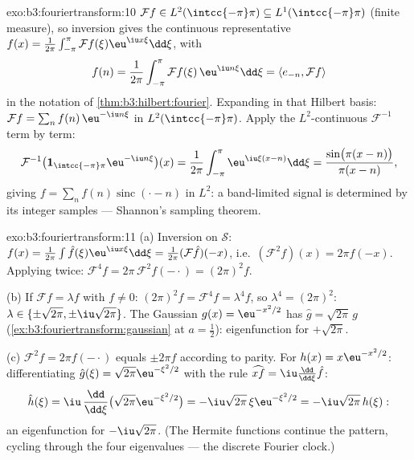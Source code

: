 \begin{solution}{exo:b3:fouriertransform:10}
$\mathcal Ff \in L^2(\intcc{-\pi}\pi) \subseteq
L^1(\intcc{-\pi}\pi)$ (finite measure), so inversion gives the
continuous representative $f(x) =
\frac1{2\pi}\int_{-\pi}^\pi\mathcal Ff(\xi)\eu^{\iu
x\xi}\dd\xi$, with
\[
f(n) = \frac1{2\pi}\int_{-\pi}^{\pi}\mathcal
Ff(\xi)\,\eu^{\iu n\xi}\dd\xi = \langle e_{-n}, \mathcal
Ff\rangle
\]
in the notation of \cref{thm:b3:hilbert:fourier}. Expanding in
that Hilbert basis: $\mathcal Ff = \sum_nf(n)\,\eu^{-\iu
n\xi}$ in $L^2(\intcc{-\pi}\pi)$. Apply the
$L^2$-continuous $\mathcal F^{-1}$ term by term:
\[
\mathcal F^{-1}\bigl(\mathbf
1_{\intcc{-\pi}\pi}\eu^{-\iu n\xi}\bigr)(x)
= \frac1{2\pi}\int_{-\pi}^{\pi}\eu^{\iu\xi(x - n)}\dd\xi
= \frac{\sin\bigl(\pi(x-n)\bigr)}{\pi(x - n)} ,
\]
giving $f = \sum_nf(n)\operatorname{sinc}(\cdot - n)$ in
$L^2$: a band-limited signal is determined by its integer
samples --- Shannon's sampling theorem.
\end{solution}

\begin{solution}{exo:b3:fouriertransform:11}
(a) Inversion on $\mathcal S$: $f(x) =
\frac1{2\pi}\int\hat f(\xi)\eu^{\iu x\xi}\dd\xi =
\frac1{2\pi}(\mathcal F\hat f)(-x)$, i.e.\ $(\mathcal
F^2f)(x) = 2\pi f(-x)$. Applying twice: $\mathcal F^4f =
2\pi\,\mathcal F^2f(-\cdot) = (2\pi)^2f$.

(b) If $\mathcal Ff = \lambda f$ with $f \neq 0$:
$(2\pi)^2f = \mathcal F^4f = \lambda^4f$, so $\lambda^4 =
(2\pi)^2$: $\lambda \in \{\pm\sqrt{2\pi},
\pm\iu\sqrt{2\pi}\}$. The Gaussian $g(x) = \eu^{-x^2/2}$ has
$\hat g = \sqrt{2\pi}\,g$
(\cref{ex:b3:fouriertransform:gaussian} at $a = \frac12$):
eigenfunction for $+\sqrt{2\pi}$.

(c) $\mathcal F^2f = 2\pi f(-\cdot)$ equals $\pm2\pi f$
according to parity. For $h(x) = x\eu^{-x^2/2}$:
differentiating $\hat g(\xi) = \sqrt{2\pi}\eu^{-\xi^2/2}$
with the rule $\widehat{xf} = \iu\frac{\dd}{\dd\xi}\hat f$:
\[
\hat h(\xi) = \iu\,\frac{\dd}{\dd\xi}\bigl(\sqrt{2\pi}
\eu^{-\xi^2/2}\bigr) = -\iu\sqrt{2\pi}\,\xi\eu^{-\xi^2/2}
= -\iu\sqrt{2\pi}\,h(\xi) :
\]
an eigenfunction for $-\iu\sqrt{2\pi}$. (The Hermite
functions continue the pattern, cycling through the four
eigenvalues --- the discrete Fourier clock.)

\end{solution}

